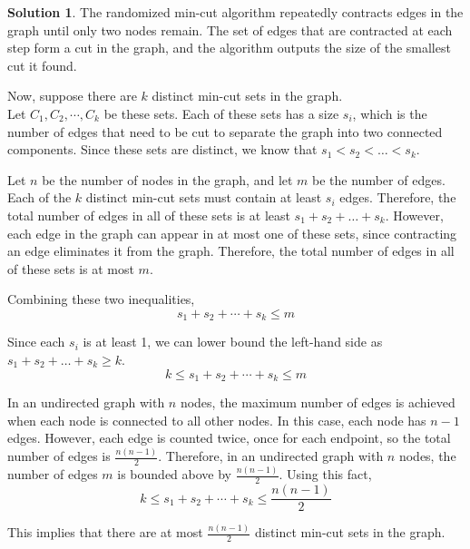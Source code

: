 \documentclass{article}
\theoremstyle{definition}
\newtheorem*{solution}{Solution}
\begin{document}
\begin{solution}
The randomized min-cut algorithm repeatedly contracts edges in the graph until only two nodes remain. The set of edges that are contracted at each step form a cut in the graph, and the algorithm outputs the size of the smallest cut it found.

\noindent
Now, suppose there are $k$ distinct min-cut sets in the graph.\\
Let $C_1, C_2, \cdots, C_k$ be these sets. Each of these sets has a size $s_i$, which is the number of edges that need to be cut to separate the graph into two connected components. Since these sets are distinct, we know that $s_1 < s_2 < \dots < s_k$.

\noindent
Let $n$ be the number of nodes in the graph, and let $m$ be the number of edges. Each of the $k$ distinct min-cut sets must contain at least $s_i$ edges. Therefore, the total number of edges in all of these sets is at least $s_1 + s_2 + \dots + s_k$. However, each edge in the graph can appear in at most one of these sets, since contracting an edge eliminates it from the graph. Therefore, the total number of edges in all of these sets is at most $m$.

\noindent
Combining these two inequalities,
\[s_1+s_2+\cdots+s_k\leq m\]

\noindent
Since each $s_i$ is at least 1, we can lower bound the left-hand side as $s_1+s_2+\dots+s_k\geq k$.
\[k\leq s_1+s_2+\cdots+s_k\leq m\]

\noindent
In an undirected graph with $n$ nodes, the maximum number of edges is achieved when each node is connected to all other nodes.
In this case, each node has $n-1$ edges.
However, each edge is counted twice, once for each endpoint, so the total number of edges is $\displaystyle\frac{n(n-1)}{2}$.
Therefore, in an undirected graph with $n$ nodes, the number of edges $m$ is bounded above by $\displaystyle\frac{n(n-1)}{2}$.
Using this fact,
\[k\leq s_1+s_2+\cdots+s_k\leq\frac{n(n-1)}{2}\]

\noindent
This implies that there are at most $\displaystyle\frac{n(n-1)}{2}$ distinct min-cut sets in the graph.
\end{solution}
\end{document}
